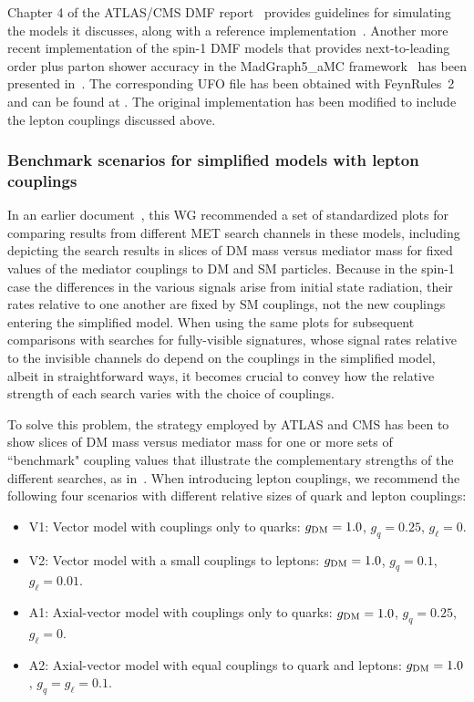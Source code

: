 \documentclass[review]{elsarticle}
\newcommand{\gDM}{\ensuremath{g_{\rm{DM}}}\xspace}
\newcommand{\gq}{\ensuremath{g_q}\xspace}
\newcommand{\gdm}{\gDM}
\begin{document}
Chapter 4 of the ATLAS/CMS DMF report~\cite{Abercrombie:2015wmb} provides guidelines for simulating the models it discusses, along with a reference implementation~\cite{LHCDMFmodels}. Another more recent implementation of the spin-1 DMF models that provides next-to-leading order plus parton shower accuracy in the {\sc MadGraph5\_aMC\@NLO} framework~\cite{Alwall:2014hca} has been presented in~\cite{Backovic:2015soa}. The corresponding {\sc UFO} file \cite{Degrande:2011ua} has been obtained with {\sc FeynRules~2}~\cite{Alloul:2013bka} and can be found at \cite{DMsimp}. The original implementation has been modified to include the lepton couplings discussed above. 

\subsubsection{Benchmark scenarios for simplified models with lepton couplings}

In an earlier document~\cite{Boveia:2016mrp}, this WG recommended a set of standardized plots for comparing results from different MET search channels in these models, including depicting the search results in slices of DM mass versus mediator mass for fixed values of the mediator couplings to DM and SM particles. Because in the spin-1 case the differences in the various signals arise from initial state radiation, their rates relative to one another are fixed by SM couplings, not the new couplings entering  the simplified model. When using the same plots for subsequent comparisons with searches for fully-visible signatures, whose signal rates relative to the invisible channels do depend on the couplings in the simplified model, albeit in straightforward ways, it becomes crucial to convey how the relative strength of each search varies with the choice of couplings.

To solve this problem, the strategy employed by ATLAS and CMS has been to show slices of DM mass versus mediator mass for one or more sets of ``benchmark" coupling values that illustrate the complementary strengths of the different searches, as in~\cite{Boveia:2016mrp,ATLASsummaryplots,CMS_SummaryPlots_ICHEP}. When introducing lepton couplings, we recommend the following four scenarios with different relative sizes of quark and lepton couplings:
\begin{itemize}
    \item V1: Vector model with couplings only to quarks: $\gdm=1.0$, $\gq = 0.25$, $g_\ell = 0$.
    \item V2: Vector model with a small couplings to leptons: $\gdm=1.0$, $\gq = 0.1$, $g_\ell = 0.01$.
    \item A1: Axial-vector model with couplings only to quarks: $\gdm=1.0$, $\gq = 0.25$, $g_\ell = 0$.
    \item A2: Axial-vector model with equal couplings to quark and leptons: $\gdm=1.0$, $g_q=g_\ell=0.1$.
\end{itemize}
\end{document}
